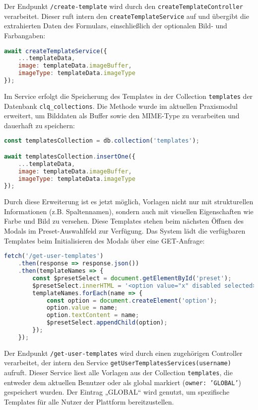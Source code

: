 Der Endpunkt \texttt{/create-template} wird durch den \texttt{createTemplateController} verarbeitet.
Dieser ruft intern den \texttt{createTemplateService} auf und übergibt die extrahierten Daten des Formulars, einschließlich der optionalen Bild- und Farbangaben:

\begin{lstlisting}[language=JavaScript, caption=Service-Aufruf im Controller]
await createTemplateService({
    ...templateData,
    image: templateData.imageBuffer,
    imageType: templateData.imageType
});
\end{lstlisting}

Im Service erfolgt die Speicherung des Templates in der Collection \texttt{templates} der Datenbank \texttt{clq\_collections}.
Die Methode wurde im aktuellen Praxismodul erweitert, um Bilddaten als Buffer sowie den MIME-Type zu verarbeiten und dauerhaft zu speichern:

\begin{lstlisting}[language=JavaScript, caption=Speicherung im createTemplateService]
const templatesCollection = db.collection('templates');

await templatesCollection.insertOne({
    ...templateData,
    image: templateData.imageBuffer,
    imageType: templateData.imageType
});
\end{lstlisting}

Durch diese Erweiterung ist es jetzt möglich, Vorlagen nicht nur mit strukturellen Informationen (z.B. Spaltennamen), sondern auch mit visuellen Eigenschaften wie Farbe und Bild zu versehen.
Diese Templates stehen beim nächsten Öffnen des Modals im Preset-Auswahlfeld zur Verfügung.
Das System lädt die verfügbaren Templates beim Initialisieren des Modals über eine GET-Anfrage:

\begin{lstlisting}[language=JavaScript, caption=Presets beim Laden des Modals laden]
fetch('/get-user-templates')
    .then(response => response.json())
    .then(templateNames => {
        const $presetSelect = document.getElementById('preset');
        $presetSelect.innerHTML = '<option value="x" disabled selected>Select preset...</option>';
        templateNames.forEach(name => {
            const option = document.createElement('option');
            option.value = name;
            option.textContent = name;
            $presetSelect.appendChild(option);
        });
    });
\end{lstlisting}

Der Endpunkt \texttt{/get-user-templates} wird durch einen zugehörigen Controller verarbeitet, der intern den Service \texttt{getUserTemplatesServices(username)} aufruft.
Dieser Service liest alle Vorlagen aus der Collection \texttt{templates}, die entweder dem aktuellen Benutzer oder als global markiert (\texttt{owner: 'GLOBAL'}) gespeichert wurden.
Der Eintrag „GLOBAL“ wird genutzt, um spezifische Templates für alle Nutzer der Plattform bereitzustellen.

